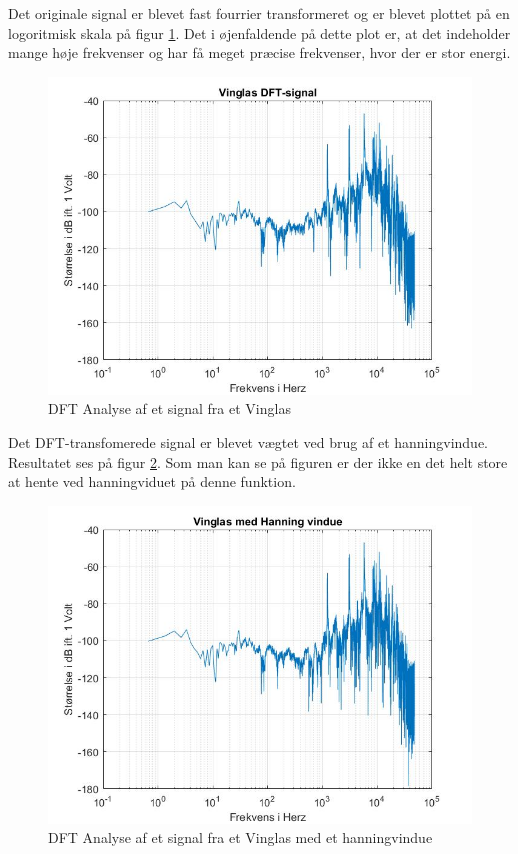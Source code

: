 Det originale signal er blevet fast fourrier transformeret og er blevet plottet på en logoritmisk skala på figur \ref{fig:Vinglas DFT}. Det i øjenfaldende på dette plot er, at det indeholder mange høje frekvenser og har få meget præcise frekvenser, hvor der er stor energi.

\begin{figure}[H]
	\centering
	\includegraphics[width=140mm]{figures/Vinglas/DFT.jpg}
	\caption{DFT Analyse af et signal fra et Vinglas}
	\label{fig:Vinglas DFT}
\end{figure}

Det DFT-transfomerede signal er blevet vægtet ved brug af et hanningvindue. Resultatet ses på figur \ref{fig:Vinglas hanning}. Som man kan se på figuren er der ikke en det helt store at hente ved hanningviduet på denne funktion.
\begin{figure}[H]
	\centering
	\includegraphics[width=140mm]{figures/Vinglas/hanning.jpg}
	\caption{DFT Analyse af et signal fra et Vinglas med et hanningvindue}
	\label{fig:Vinglas hanning}
\end{figure}

